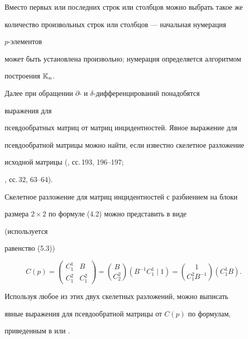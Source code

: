 


Вместо первых или последних строк или столбцов можно выбрать такое же 


количество произвольных строк или столбцов --- начальная нумерация 


$p$-элементов 


может быть установлена произвольно; нумерация определяется алгоритмом 


построения $\Bbb K_n$. 


 


Далее при обращении $\partial$- и $\delta$-дифференцирований понадобятся 


выражения для 


псевдообратных матриц от матриц инцидентностей. Явное выражение для 


псевдообратной матрицы можно найти, если известно скелетное разложение 


исходной матрицы (\cite{Bek}, сс.\,193, 196--197; 


\cite{Gan}, сс.\,32, 63--64). 


Скелетное разложение для матриц инцидентностей с разбиением на блоки 


размера $2\times 2$ по формуле (4.2) можно представить в виде 


(используется 


равенство (5.3)) 


\begin{equation} 


C(p)= 


\begin{pmatrix} 


C^1_1 & B\\ 


C^2_1 & C^2_1 


\end{pmatrix} 


=\binom{B}{C^2_2}(B^{-1}C^1_1\mid 1)=\binom{1}{C^2_1 B^{-1}}(C^1_1 B). 


\end{equation} 


 


Используя любое из этих двух скелетных разложений, можно выписать 


явные выражения для псевдообратной матрицы от $C(p)$ по формулам, 


приведенным в \cite{Bek} или \cite{Gan}. 


